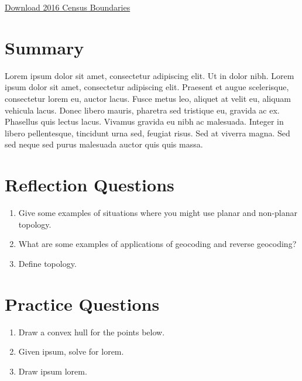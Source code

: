 \documentclass[
]{book}
\providecommand{\tightlist}{%
  \setlength{\itemsep}{0pt}\setlength{\parskip}{0pt}}
\begin{document}
\href{https://www12.statcan.gc.ca/census-recensement/2011/geo/bound-limit/bound-limit-2016-eng.cfm}{Download 2016 Census Boundaries}

\hypertarget{summary-6}{%
\section{Summary}\label{summary-6}}

Lorem ipsum dolor sit amet, consectetur adipiscing elit. Ut in dolor nibh. Lorem ipsum dolor sit amet, consectetur adipiscing elit. Praesent et augue scelerisque, consectetur lorem eu, auctor lacus. Fusce metus leo, aliquet at velit eu, aliquam vehicula lacus. Donec libero mauris, pharetra sed tristique eu, gravida ac ex. Phasellus quis lectus lacus. Vivamus gravida eu nibh ac malesuada. Integer in libero pellentesque, tincidunt urna sed, feugiat risus. Sed at viverra magna. Sed sed neque sed purus malesuada auctor quis quis massa.

\hypertarget{reflection-questions-5}{%
\section*{Reflection Questions}\label{reflection-questions-5}}

\begin{enumerate}
\def\labelenumi{\arabic{enumi}.}
\tightlist
\item
  Give some examples of situations where you might use planar and non-planar topology.
\item
  What are some examples of applications of geocoding and reverse geocoding?
\item
  Define topology.
\end{enumerate}

\hypertarget{practice-questions-5}{%
\section*{Practice Questions}\label{practice-questions-5}}

\begin{enumerate}
\def\labelenumi{\arabic{enumi}.}
\tightlist
\item
  Draw a convex hull for the points below.
\item
  Given ipsum, solve for lorem.
\item
  Draw ipsum lorem.
\end{enumerate}
\end{document}
